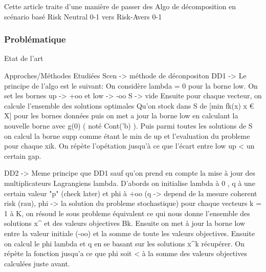 \documentclass{beamer}
\begin{document}

        \begin{frame}

            
            Cette article traite d'une manière de passer des Algo de décomposition en scénario basé Risk Neutral 0-1 
            vers Risk-Avers 0-1

        \end{frame}
        
        \begin{frame}

            \frametitle{Problématique}
            
           

        \end{frame}
        
        
        \begin{frame}

            Etat de l'art

        \end{frame}
        
        \begin{frame}

            Approches/Méthodes Etudiées
            Scen -> méthode de déconpositon DD1 -> Le principe de l'algo est le suivant: On considère lambda = 0 pour
            la borne low.
            On set les bornes up -> +oo et low -> -oo S -> vide
            Ensuite pour chaque vecteur, on calcule l'ensemble des solutions optimales Qu'on stock dans S 
            de [min fk(x) x € X] pour les bornes données puis on met a jour la borne low en calculant la nouvelle borne
                avec g(0) ( noté Cont('b) ). Puis parmi toutes les solutions de S on calcul la borne supp
                comme étant le min de up et l'evaluation du probleme pour chaque xik. On répète l'opétation jusqu'à
                ce que l'écart entre low up < un certain gap.
                
                
                
                
          DD2 -> Meme principe que DD1 sauf qu'on prend en compte la mise à jour des multiplicateurs
          Lagrangiens lambda. D'abords on initialise lambda à 0 , q à une certain valeur "p" (check later)
          et phi à +oo (q -> depend de la mesure coherent risk (rau), phi -> la solution du probleme stochastique)
          pour chaque vecteurs k = 1 à K, on résoud le sous probleme équivalent ce qui nous donne 
          l'ensemble des solutions x^ et des valeurs objectives Bk. 
          Ensuite on met à jour la borne low entre la valeur initiale (-oo) et la somme de toute les valeurs objectives.
          Ensuite on calcul le phi lambda et q  en se basant sur les solutions x^k récupérer.
          On répète la fonction jusqu'a ce que phi soit < à la somme des valeurs objectives calculées juste avant.
          
          
        \end{frame}
        
\end{document}
